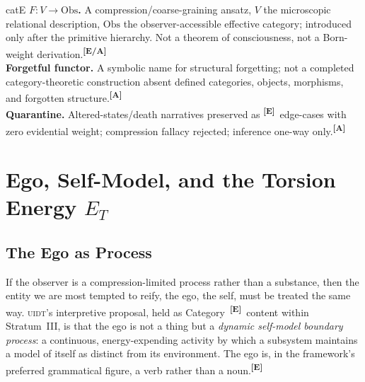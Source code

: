 \documentclass[12pt,a4paper,twoside]{article}
\theoremstyle{plain}
\theoremstyle{definition}
\theoremstyle{remark}
\newcommand{\UIDT}{\textsc{uidt}}
\newcommand{\catmark}[1]{\textsuperscript{\textsf{\textbf{[#1]}}}}
\begin{document}
\begin{evidencebox}{catE}
\textbf{$F\colon V\to\mathrm{Obs}$.} A compression/coarse-graining ansatz, $V$ the microscopic relational description, $\mathrm{Obs}$ the observer-accessible effective category; introduced only after the primitive hierarchy. Not a theorem
of consciousness, not a Born-weight derivation.\catmark{E/A}\\[0.3em]
\textbf{Forgetful functor.} A symbolic name for structural forgetting; not a completed category-theoretic construction absent defined categories, objects,
morphisms, and forgotten structure.\catmark{A}\\[0.3em]
\textbf{Quarantine.} Altered-states/death narratives preserved as \catmark{E}\ edge-cases with zero evidential weight; compression fallacy rejected; inference one-way only.\catmark{A}
\end{evidencebox}

\newpage
\section{Ego, Self-Model, and the Torsion Energy \texorpdfstring{$E_T$}{E_T}}
\label{sec:ego-selfmodel-et}

\subsection{The Ego as Process}
\label{subsec:ego-as-process}

If the observer is a compression-limited process rather than a substance, then the entity we are most tempted to reify, the ego, the self, must be treated the same way. \UIDT's interpretive proposal, held as Category~\catmark{E}\ content within Stratum~III, is that the ego is not a thing but a \emph{dynamic self-model boundary process}: a continuous, energy-expending activity by which a subsystem maintains a model of itself as distinct from its environment. The ego is, in the framework's preferred grammatical figure, a verb rather than a noun.\catmark{E}
\end{document}
